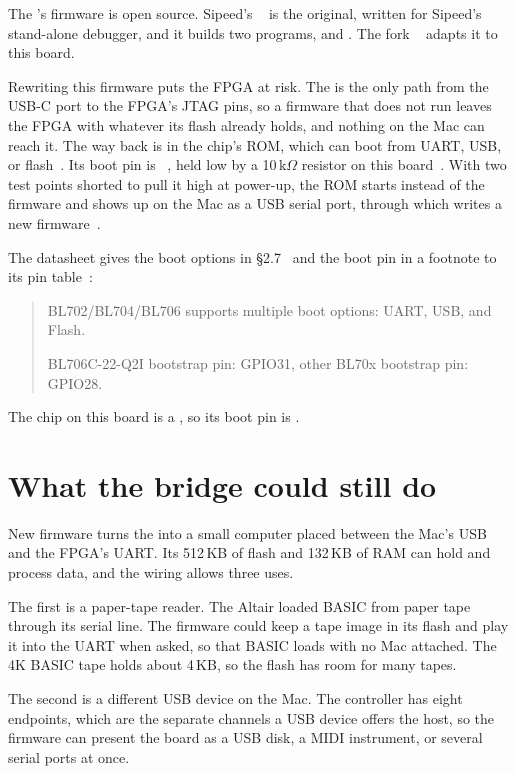 \documentclass[11pt,a4paper]{article}
\newenvironment{datasheet}{\begin{quote}\small\sffamily}{\end{quote}}
\begin{document}
The ’s firmware is open source. Sipeed’s ~\cite{rvdebugger} is the original, written for Sipeed’s stand-alone debugger, and it builds two programs,  and . The fork ~\cite{tn9kfork} adapts it to this board.

Rewriting this firmware puts the FPGA at risk. The  is the only path from the USB-C port to the FPGA’s JTAG pins, so a firmware that does not run leaves the FPGA with whatever its flash already holds, and nothing on the Mac can reach it. The way back is in the chip’s ROM, which can boot from UART, USB, or flash~\cite[§2.7]{blds}. Its boot pin is ~\cite[PDF p.~36]{blds}, held low by a 10\,k$\Omega$ resistor on this board~\cite[p.~4]{schematic}. With two test points shorted to pull it high at power-up, the ROM starts instead of the firmware and shows up on the Mac as a USB serial port, through which  writes a new firmware~\cite{tn9kfork}.

The datasheet gives the boot options in §2.7~\cite{blds} and the boot pin in a footnote to its pin table~\cite[PDF p.~36]{blds}:
\begin{datasheet}
BL702/BL704/BL706 supports multiple boot options: UART, USB, and Flash.

BL706C-22-Q2I bootstrap pin: GPIO31, other BL70x bootstrap pin: GPIO28.
\end{datasheet}
The chip on this board is a , so its boot pin is .

\section*{What the bridge could still do}

New firmware turns the  into a small computer placed between the Mac’s USB and the FPGA’s UART. Its 512\,KB of flash and 132\,KB of RAM can hold and process data, and the wiring allows three uses.

The first is a paper-tape reader. The Altair loaded BASIC from paper tape through its serial line. The firmware could keep a tape image in its flash and play it into the UART when asked, so that BASIC loads with no Mac attached. The 4K BASIC tape holds about 4\,KB, so the flash has room for many tapes.

The second is a different USB device on the Mac. The controller has eight endpoints, which are the separate channels a USB device offers the host, so the firmware can present the board as a USB disk, a MIDI instrument, or several serial ports at once.
\end{document}
